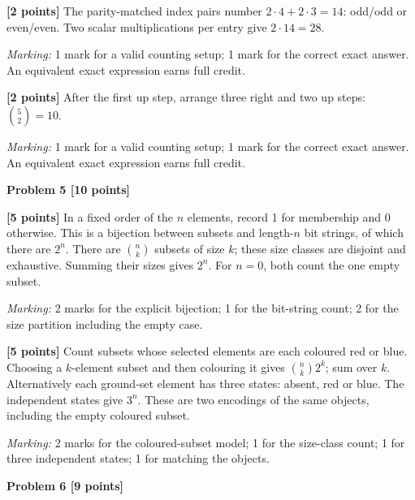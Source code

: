 \documentclass[12pt,letterpaper]{article}
\newcommand{\problemheading}[2][5\baselineskip]{\Needspace{#1}\par\noindent\hspace*{-0.625in}\textbf{#2}\par\nobreak\vspace{0.3em}}
\begin{document}
\begin{description}[font=\normalfont,leftmargin=1.2em,labelsep=0.4em]
\item[(g)] \textbf{[2 points]} The parity-matched index pairs number $2\cdot4+2\cdot3=14$: odd/odd or even/even. Two scalar multiplications per entry give $2\cdot14=28$.
\par\textit{Marking:} 1 mark for a valid counting setup; 1 mark for the correct exact answer. An equivalent exact expression earns full credit.
\item[(h)] \textbf{[2 points]} After the first up step, arrange three right and two up steps: $\binom52=10$.
\par\textit{Marking:} 1 mark for a valid counting setup; 1 mark for the correct exact answer. An equivalent exact expression earns full credit.
\end{description}
\vspace{0.65em}
\problemheading[\dimexpr 3\baselineskip+4\baselineskip\relax]{Problem 5 [10 points]}
\begin{description}[font=\normalfont,leftmargin=1.2em,labelsep=0.4em]
\item[(a)] \textbf{[5 points]} In a fixed order of the $n$ elements, record 1 for membership and 0 otherwise. This is a bijection between subsets and length-$n$ bit strings, of which there are $2^n$. There are $\binom nk$ subsets of size $k$; these size classes are disjoint and exhaustive. Summing their sizes gives $2^n$. For $n=0$, both count the one empty subset.
\par\textit{Marking:} 2 marks for the explicit bijection; 1 for the bit-string count; 2 for the size partition including the empty case.
\item[(b)] \textbf{[5 points]} Count subsets whose selected elements are each coloured red or blue. Choosing a $k$-element subset and then colouring it gives $\binom nk2^k$; sum over $k$. Alternatively each ground-set element has three states: absent, red or blue. The independent states give $3^n$. These are two encodings of the same objects, including the empty coloured subset.
\par\textit{Marking:} 2 marks for the coloured-subset model; 1 for the size-class count; 1 for three independent states; 1 for matching the objects.
\end{description}
\vspace{0.65em}
\problemheading[\dimexpr 3\baselineskip+4\baselineskip\relax]{Problem 6 [9 points]}
\end{document}
